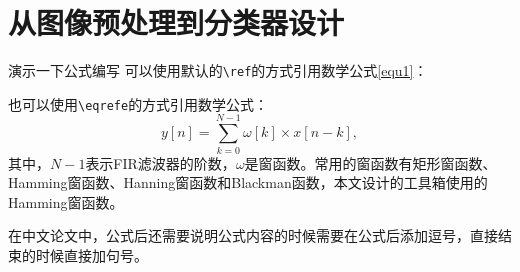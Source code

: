 
\renewcommand{\baselinestretch}{1.345}
\fontsize{12pt}{14.4pt}\selectfont
\chapter{从图像预处理到分类器设计}
演示一下公式编写
可以使用默认的\verb|\ref|的方式引用数学公式\ref{equ1}：

也可以使用\verb|\eqrefe|的方式引用数学公式：
\begin{equation}
y[n] = \sum_{k =0}^{N-1}\omega[k] \times x[n-k],
\label{equ1}
\end{equation}
其中，$N-1$表示FIR滤波器的阶数，$\omega$是窗函数。常用的窗函数有矩形窗函数、Hamming窗函数、Hanning窗函数和Blackman函数，本文设计的工具箱使用的Hamming窗函数。

在中文论文中，公式后还需要说明公式内容的时候需要在公式后添加逗号，直接结束的时候直接加句号。


\endinput